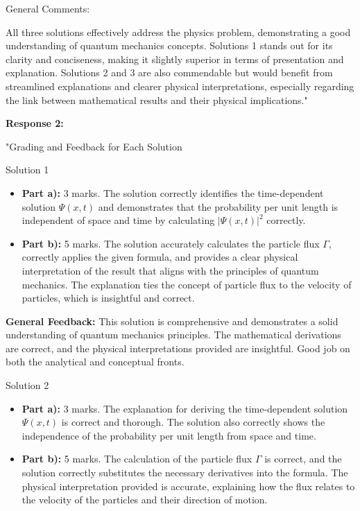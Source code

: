 \documentclass[a4paper,11pt]{article}
\begin{document}
General Comments:

All three solutions effectively address the physics problem, demonstrating a good understanding of quantum mechanics concepts. Solutions 1 stands out for its clarity and conciseness, making it slightly superior in terms of presentation and explanation. Solutions 2 and 3 are also commendable but would benefit from streamlined explanations and clearer physical interpretations, especially regarding the link between mathematical results and their physical implications."

\textbf{Response 2:}

"Grading and Feedback for Each Solution

Solution 1
\begin{itemize}
    \item \textbf{Part a):} 3 marks. The solution correctly identifies the time-dependent solution \(\Psi(x,t)\) and demonstrates that the probability per unit length is independent of space and time by calculating \(|\Psi(x,t)|^2\) correctly.
    \item \textbf{Part b):} 5 marks. The solution accurately calculates the particle flux \(\Gamma\), correctly applies the given formula, and provides a clear physical interpretation of the result that aligns with the principles of quantum mechanics. The explanation ties the concept of particle flux to the velocity of particles, which is insightful and correct.
\end{itemize}

\textbf{General Feedback:} This solution is comprehensive and demonstrates a solid understanding of quantum mechanics principles. The mathematical derivations are correct, and the physical interpretations provided are insightful. Good job on both the analytical and conceptual fronts.

Solution 2
\begin{itemize}
    \item \textbf{Part a):} 3 marks. The explanation for deriving the time-dependent solution \(\Psi(x,t)\) is correct and thorough. The solution also correctly shows the independence of the probability per unit length from space and time.
    \item \textbf{Part b):} 5 marks. The calculation of the particle flux \(\Gamma\) is correct, and the solution correctly substitutes the necessary derivatives into the formula. The physical interpretation provided is accurate, explaining how the flux relates to the velocity of the particles and their direction of motion.
\end{itemize}
\end{document}
